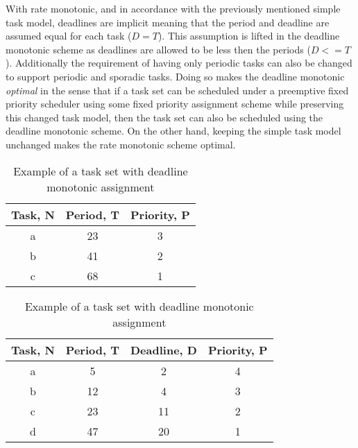 With rate monotonic, and in accordance with the previously mentioned simple task model, deadlines are implicit meaning that the period and deadline are assumed equal for each task ($D = T$). This assumption is lifted in the deadline monotonic scheme as deadlines are allowed to be less then the periods ($D <= T$). Additionally the requirement of having only periodic tasks can also be changed to support periodic and sporadic tasks. Doing so makes the deadline monotonic \textit{optimal} in the sense that if a task set can be scheduled under a preemptive fixed priority scheduler using some fixed priority assignment scheme while preserving this changed task model, then the task set can also be scheduled using the deadline monotonic scheme. On the other hand, keeping the simple task model unchanged makes the rate monotonic scheme optimal.

\begin{table}[ht]
\begin{minipage}[b]{0.45\linewidth}
\caption{Example of a task set with rate monotonic assignment}
\centering
\begin{tabular}{c c c}
\hline\hline
Task, N & Period, T & Priority, P \\ [0.5ex]
\hline 
a & 23 & 3 \\
b & 41 & 2 \\
c & 68 & 1 \\ [1ex]
\hline
\end{tabular}
\end{minipage}
\hspace{0.5cm}
\begin{minipage}[b]{0.45\linewidth}
\caption{Example of a task set with deadline monotonic assignment}
\centering
\begin{tabular}{c c c c}
\hline\hline
Task, N & Period, T & Deadline, D & Priority, P \\ [0.5ex]
\hline 
a & 5  & 2 & 4 \\
b & 12 & 4 & 3 \\
c & 23 & 11 & 2  \\
d & 47 & 20 & 1  \\ [1ex]
\hline
\end{tabular}
\end{minipage}
\end{table}


